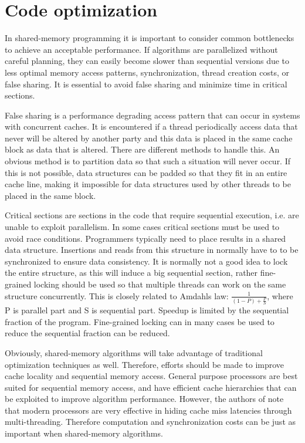 
\section{Code optimization}
\label{sec:optimization}

In shared-memory programming it is important to consider common
bottlenecks to achieve an acceptable performance. If algorithms are
parallelized without careful planning, they can easily become slower
than sequential versions due to less optimal memory access patterns,
synchronization, thread creation costs, or false sharing. It is
essential to avoid false sharing and minimize time in critical
sections.

False sharing is a performance degrading access pattern that can occur
in systems with concurrent caches. It is encountered if a thread
periodically access data that never will be altered by another party
and this data is placed in the same cache block as data that is
altered. There are different methods to handle this. An obvious method
is to partition data so that such a situation will never occur. If
this is not possible, data structures can be padded so that they fit
in an entire cache line, making it impossible for data structures used
by other threads to be placed in the same block.

Critical sections are sections in the code that require sequential
execution, i.e. are unable to exploit parallelism. In some cases
critical sections must be used to avoid race conditions. Programmers
typically need to place results in a shared data structure. Insertions
and reads from this structure in normally have to to be synchronized
to ensure data consistency. It is normally not a good idea to lock the
entire structure, as this will induce a big sequential section, rather
fine-grained locking should be used so that multiple threads can work
on the same structure concurrently. This is closely related to Amdahls
law: $\frac{1}{(1-P)+\frac{P}{S}}$, where P is parallel part and S is
sequential part. Speedup is limited by the sequential fraction of the
program. Fine-grained locking can in many cases be used to reduce the
sequential fraction can be reduced.

Obviously, shared-memory algorithms will take advantage of traditional
optimization techniques as well. Therefore, efforts should be made to
improve cache locality and sequential memory access. General purpose
processors are best suited for sequential memory access, and have
efficient cache hierarchies that can be exploited to improve algorithm
performance. However, the authors of \cite{hashjoin} note that modern
processors are very effective in hiding cache miss latencies through
multi-threading. Therefore computation and synchronization costs can
be just as important when shared-memory algorithms.

